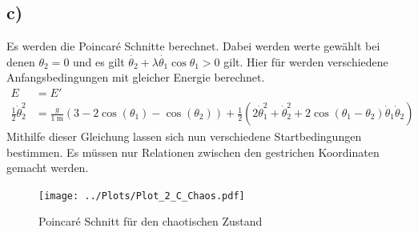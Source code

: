 \subsection*{c)}
Es werden die Poincaré Schnitte berechnet.
Dabei werden werte gewählt bei denen $\theta_2=0$ und es gilt $\dot{\theta_2}+\lambda\dot{\theta_1}\cos\theta_1>0$ gilt.
Hier für werden verschiedene Anfangsbedingungen mit gleicher Energie berechnet.
\begin{align}
	E&=E'\\
	\frac{1}{2}\dot{\theta}_2^2&=\frac{g}{\SI{1}{\meter}}(3-2\cos(\theta_1)-\cos(\theta_2)) + \frac{1}{2}\left( 2\dot{\theta}_1^2 +\dot{\theta}_2^2 + 2\cos(\theta_1-\theta_2)\dot{\theta}_1\dot{\theta}_2 \right)
\end{align}
Mithilfe dieser Gleichung lassen sich nun verschiedene Startbedingungen bestimmen.
Es müssen nur Relationen zwischen den gestrichen Koordinaten gemacht werden.
\begin{figure}
	\centering
	\texttt{[image: ../Plots/Plot\_2\_C\_Chaos.pdf]}
	\caption{Poincaré Schnitt für den chaotischen Zustand}
\end{figure}